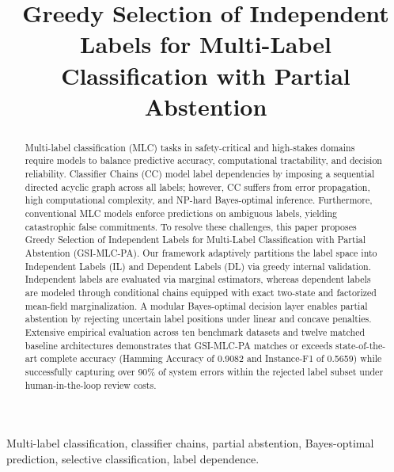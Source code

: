 \documentclass[conference]{IEEEtran}
\begin{document}
\title{Greedy Selection of Independent Labels for Multi-Label Classification with Partial Abstention}

\author{
}

\maketitle

\begin{abstract}
Multi-label classification (MLC) tasks in safety-critical and high-stakes domains require models to balance predictive accuracy, computational tractability, and decision reliability. Classifier Chains (CC) model label dependencies by imposing a sequential directed acyclic graph across all labels; however, CC suffers from error propagation, high computational complexity, and NP-hard Bayes-optimal inference. Furthermore, conventional MLC models enforce predictions on ambiguous labels, yielding catastrophic false commitments. To resolve these challenges, this paper proposes Greedy Selection of Independent Labels for Multi-Label Classification with Partial Abstention (GSI-MLC-PA). Our framework adaptively partitions the label space into Independent Labels (IL) and Dependent Labels (DL) via greedy internal validation. Independent labels are evaluated via marginal estimators, whereas dependent labels are modeled through conditional chains equipped with exact two-state and factorized mean-field marginalization. A modular Bayes-optimal decision layer enables partial abstention by rejecting uncertain label positions under linear and concave penalties. Extensive empirical evaluation across ten benchmark datasets and twelve matched baseline architectures demonstrates that GSI-MLC-PA matches or exceeds state-of-the-art complete accuracy (Hamming Accuracy of 0.9082 and Instance-F1 of 0.5659) while successfully capturing over 90\% of system errors within the rejected label subset under human-in-the-loop review costs.
\end{abstract}

\begin{IEEEkeywords}
Multi-label classification, classifier chains, partial abstention, Bayes-optimal prediction, selective classification, label dependence.
\end{IEEEkeywords}
\end{document}
